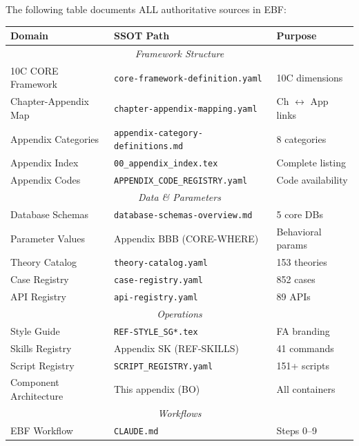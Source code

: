 \begin{tcolorbox}[colback=yellow!5!white, colframe=yellow!75!black,
    title=Complete SSOT Registry]

The following table documents ALL authoritative sources in EBF:

\begin{center}
\small
\begin{tabular}{|l|l|l|}
\hline
\textbf{Domain} & \textbf{SSOT Path} & \textbf{Purpose} \\
\hline
\multicolumn{3}{|c|}{\textit{Framework Structure}} \\
\hline
10C CORE Framework & \texttt{core-framework-definition.yaml} & 10C dimensions \\
Chapter-Appendix Map & \texttt{chapter-appendix-mapping.yaml} & Ch $\leftrightarrow$ App links \\
Appendix Categories & \texttt{appendix-category-definitions.md} & 8 categories \\
Appendix Index & \texttt{00\_appendix\_index.tex} & Complete listing \\
Appendix Codes & \texttt{APPENDIX\_CODE\_REGISTRY.yaml} & Code availability \\
\hline
\multicolumn{3}{|c|}{\textit{Data \& Parameters}} \\
\hline
Database Schemas & \texttt{database-schemas-overview.md} & 5 core DBs \\
Parameter Values & Appendix BBB (CORE-WHERE) & Behavioral params \\
Theory Catalog & \texttt{theory-catalog.yaml} & 153 theories \\
Case Registry & \texttt{case-registry.yaml} & 852 cases \\
API Registry & \texttt{api-registry.yaml} & 89 APIs \\
\hline
\multicolumn{3}{|c|}{\textit{Operations}} \\
\hline
Style Guide & \texttt{REF-STYLE\_SG*.tex} & FA branding \\
Skills Registry & Appendix SK (REF-SKILLS) & 41 commands \\
Script Registry & \texttt{SCRIPT\_REGISTRY.yaml} & 151+ scripts \\
Component Architecture & This appendix (BO) & All containers \\
\hline
\multicolumn{3}{|c|}{\textit{Workflows}} \\
\hline
EBF Workflow & \texttt{CLAUDE.md} & Steps 0--9 \\
\hline
\end{tabular}
\end{center}

\end{tcolorbox}


